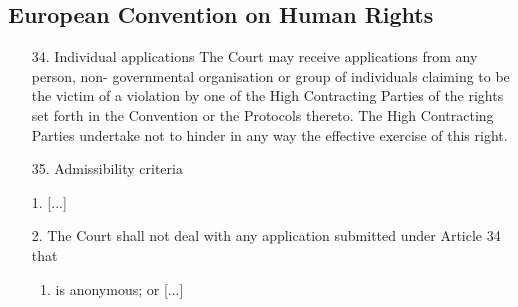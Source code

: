 \documentclass[aps,prb,twocolumn,superscriptaddress,floatfix,longbibliography,nofootinbib]{revtex4-2}
\begin{document}
  \subsection{\label{subsec:ECHR}European Convention on Human Rights}
  \begin{enumerate}
    \item[34.] Individual applications
  The Court may receive applications from any person, non-
  governmental organisation or group of individuals claiming to be
  the victim of a violation by one of the High Contracting Parties of
  the rights set forth in the Convention or the Protocols thereto. The
  High Contracting Parties undertake not to hinder in any way the
  effective exercise of this right.

\item[35.] Admissibility criteria
\end{enumerate}
  \begin{enumerate}
    \item[1.] [...]
    \item[2.] The Court shall not deal with any application submitted under Article 34 that
    \begin{enumerate}
      \item is anonymous; or [...]
    \end{enumerate}
  \end{enumerate}
  \cite{ECHR1950}
\end{document}
